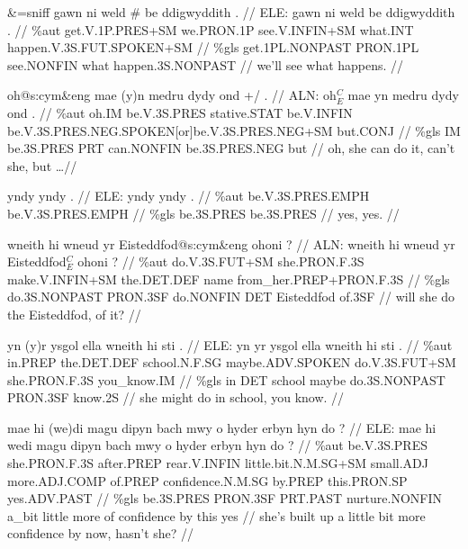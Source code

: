 \documentclass[a4paper,10pt]{article}
\begin{document}
\ex
\begingl[lingstyle=gergl]
\glchat \&=sniff gawn ni weld \# be ddigwyddith . //
\glsurface ELE:  gawn ni weld be ddigwyddith .  //
\glauto \%aut  get{\scriptsize .V.1P.PRES+SM} we{\scriptsize .PRON.1P} see{\scriptsize .V.INFIN+SM} what{\scriptsize .INT} happen{\scriptsize .V.3S.FUT.SPOKEN+SM}   //
\glmanual \%gls  get{\scriptsize .1PL.NONPAST} PRON{\scriptsize .1PL} see{\scriptsize .NONFIN} what happen{\scriptsize .3S.NONPAST}   //
\gleng we'll see what happens. //
\endgl
\xe

\ex
\begingl[lingstyle=gergl]
\glchat oh@s:cym\&eng mae (y)n medru dydy ond +/ . //
\glsurface ALN:  oh$^{C}_{E}$ mae yn medru dydy ond .  //
\glauto \%aut  oh{\scriptsize .IM} be{\scriptsize .V.3S.PRES} stative{\scriptsize .STAT} be{\scriptsize .V.INFIN} be{\scriptsize .V.3S.PRES.NEG.SPOKEN[or]be.V.3S.PRES.NEG+SM} but{\scriptsize .CONJ}   //
\glmanual \%gls  IM be{\scriptsize .3S.PRES} PRT can{\scriptsize .NONFIN} be{\scriptsize .3S.PRES.NEG} but   //
\gleng oh, she can do it, can't she, but \dots  //
\endgl
\xe

\ex
\begingl[lingstyle=gergl]
\glchat yndy yndy . //
\glsurface ELE:  yndy yndy .  //
\glauto \%aut  be{\scriptsize .V.3S.PRES.EMPH} be{\scriptsize .V.3S.PRES.EMPH}   //
\glmanual \%gls  be{\scriptsize .3S.PRES} be{\scriptsize .3S.PRES}   //
\gleng yes, yes. //
\endgl
\xe

\ex
\begingl[lingstyle=gergl]
\glchat wneith hi wneud yr Eisteddfod@s:cym\&eng ohoni ? //
\glsurface ALN:  wneith hi wneud yr Eisteddfod$^{C}_{E}$ ohoni ?  //
\glauto \%aut  do{\scriptsize .V.3S.FUT+SM} she{\scriptsize .PRON.F.3S} make{\scriptsize .V.INFIN+SM} the{\scriptsize .DET.DEF} name from\_her{\scriptsize .PREP+PRON.F.3S}   //
\glmanual \%gls  do{\scriptsize .3S.NONPAST} PRON{\scriptsize .3SF} do{\scriptsize .NONFIN} DET Eisteddfod of{\scriptsize .3SF}   //
\gleng will she do the Eisteddfod, of it? //
\endgl
\xe

\ex
\begingl[lingstyle=gergl]
\glchat yn (y)r ysgol ella wneith hi sti . //
\glsurface ELE:  yn yr ysgol ella wneith hi sti .  //
\glauto \%aut  in{\scriptsize .PREP} the{\scriptsize .DET.DEF} school{\scriptsize .N.F.SG} maybe{\scriptsize .ADV.SPOKEN} do{\scriptsize .V.3S.FUT+SM} she{\scriptsize .PRON.F.3S} you\_know{\scriptsize .IM}   //
\glmanual \%gls  in DET school maybe do{\scriptsize .3S.NONPAST} PRON{\scriptsize .3SF} know{\scriptsize .2S}   //
\gleng she might do in school, you know. //
\endgl
\xe

\ex
\begingl[lingstyle=gergl]
\glchat mae hi (we)di magu dipyn bach mwy o hyder erbyn hyn do ? //
\glsurface ELE:  mae hi wedi magu dipyn bach mwy o hyder erbyn hyn do ?  //
\glauto \%aut  be{\scriptsize .V.3S.PRES} she{\scriptsize .PRON.F.3S} after{\scriptsize .PREP} rear{\scriptsize .V.INFIN} little{\scriptsize .bit.N.M.SG+SM} small{\scriptsize .ADJ} more{\scriptsize .ADJ.COMP} of{\scriptsize .PREP} confidence{\scriptsize .N.M.SG} by{\scriptsize .PREP} this{\scriptsize .PRON.SP} yes{\scriptsize .ADV.PAST}   //
\glmanual \%gls  be{\scriptsize .3S.PRES} PRON{\scriptsize .3SF} PRT{\scriptsize .PAST} nurture{\scriptsize .NONFIN} a\_bit little more of confidence by this yes   //
\gleng she's built up a little bit more confidence by now, hasn't she? //
\endgl
\xe
\end{document}
